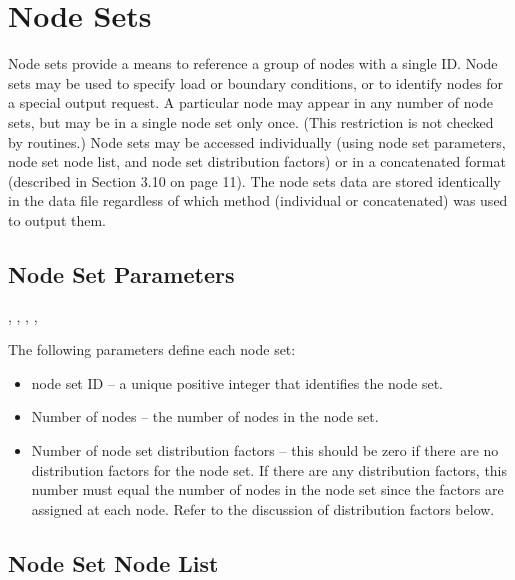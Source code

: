 \section{Node Sets}

Node sets provide a means to reference a group of nodes with a single
ID. Node sets may be used to specify load or boundary
conditions, or to identify nodes for a special
output request. A particular node may appear in any number of node
sets, but may be in a single node set only once. (This restriction is
not checked by \exo{} routines.) Node sets may be accessed
individually (using node set parameters, node set node list, and node
set distribution factors) or in a concatenated format (described in
Section 3.10 on page 11). The node sets data are stored identically in
the data file regardless of which method (individual or concatenated)
was used to output them.

\subsection{Node Set Parameters}

\begin{spacing}{1.5}
\api {}, , 
\api {}, , 
\end{spacing}

{The following parameters define each node set:}

\begin{itemize}
 \item {node set ID -- a unique positive integer that identifies the
 node set.}

 \item {Number of nodes -- the number of nodes in the node
set.}

 \item {Number of node set distribution factors -- this should be zero
 if there are no distribution factors for the node set. If there are
 any distribution factors, this number must equal the number of nodes
 in the node set since the factors are assigned at each node. Refer to
 the discussion of distribution factors below.}
\end{itemize}



\subsection{Node Set Node List}

